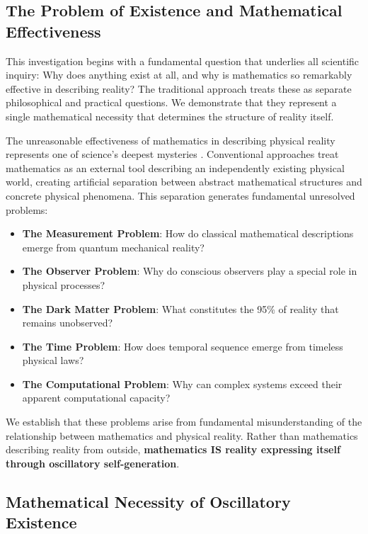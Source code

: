 \documentclass[11pt,a4paper]{article}
\theoremstyle{remark}
\begin{document}
\subsection{The Problem of Existence and Mathematical Effectiveness}

This investigation begins with a fundamental question that underlies all scientific inquiry: Why does anything exist at all, and why is mathematics so remarkably effective in describing reality? The traditional approach treats these as separate philosophical and practical questions. We demonstrate that they represent a single mathematical necessity that determines the structure of reality itself.

The unreasonable effectiveness of mathematics in describing physical reality represents one of science's deepest mysteries \cite{wigner1960unreasonable}. Conventional approaches treat mathematics as an external tool describing an independently existing physical world, creating artificial separation between abstract mathematical structures and concrete physical phenomena. This separation generates fundamental unresolved problems:

\begin{itemize}
\item \textbf{The Measurement Problem}: How do classical mathematical descriptions emerge from quantum mechanical reality?
\item \textbf{The Observer Problem}: Why do conscious observers play a special role in physical processes?
\item \textbf{The Dark Matter Problem}: What constitutes the 95\% of reality that remains unobserved?
\item \textbf{The Time Problem}: How does temporal sequence emerge from timeless physical laws?
\item \textbf{The Computational Problem}: Why can complex systems exceed their apparent computational capacity?
\end{itemize}

We establish that these problems arise from fundamental misunderstanding of the relationship between mathematics and physical reality. Rather than mathematics describing reality from outside, \textbf{mathematics IS reality expressing itself through oscillatory self-generation}.

\subsection{Mathematical Necessity of Oscillatory Existence}
\end{document}
